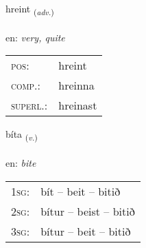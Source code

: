 \documentclass[frontgrid, backgrid]{flacards}\usepackage[]{graphicx}\usepackage[]{xcolor}
\begin{document}
\renewcommand{\blhead}{\vskip5pt {\small\bfseries\footnotesize Atviksorð | Adverb }}
\renewcommand{\bcfoot}{\vskip5pt \hspace{2pt}{\small\bfseries\footnotesize 3K}}


{hreint \small{\textsubscript{(\textit{adv.})}} \\[1ex] %
\textphonetic{[r̥ein̥t]} \\
en: \emph{very, quite} \\  [2ex]
\renewcommand*{\arraystretch}{0.8}
\begin{tabular}{ll}
\textsc{pos}: & hreint \\ 
\textsc{comp.}: & hreinna \\ 
\textsc{superl.}: & hreinast \\
\end{tabular}
}

\renewcommand{\flhead}{\vskip5pt \fboxsep=0pt {\small\bfseries\footnotesize Sagnorð | Verb}}
\renewcommand{\fcfoot}{\vskip5pt \fboxsep=0pt \hspace{2pt}{\small\bfseries\footnotesize 3K}}

\renewcommand{\blhead}{\vskip5pt {\small\bfseries\footnotesize Sagnorð | Verb }}
\renewcommand{\bcfoot}{\vskip5pt \hspace{2pt}{\small\bfseries\footnotesize 3K}}


{bíta \small{\textsubscript{(\textit{v.})}} \\[1ex] %
\textphonetic{[piːta]} \\
en: \emph{bite} \\  [2ex]
\renewcommand*{\arraystretch}{0.8}
\begin{tabular}{p{1cm}l}
\textsc{1sg}: & bít -- beit -- bitið \\ 
\textsc{2sg}: & bítur -- beist -- bitið \\ 
\textsc{3sg}: & bítur -- beit -- bitið \\ 
\end{tabular}
}

\renewcommand{\flhead}{\vskip5pt \fboxsep=0pt {\small\bfseries\footnotesize Nafnorð | Noun}}
\renewcommand{\fcfoot}{\vskip5pt \fboxsep=0pt \hspace{2pt}{\small\bfseries\footnotesize 3K}}
\end{document}
